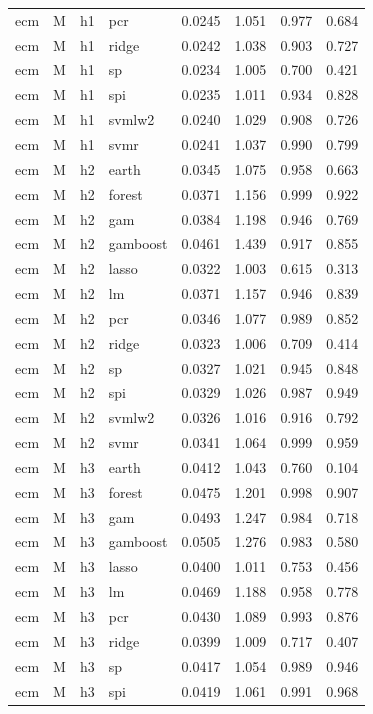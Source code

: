 \begin{ThreePartTable}
\begin{longtable}[t]{llclcccc}
ecm & M & h1 & pcr & 0.0245 & 1.051 & 0.977 & 0.684\\
ecm & M & h1 & ridge & 0.0242 & 1.038 & 0.903 & 0.727\\
ecm & M & h1 & sp & 0.0234 & 1.005 & 0.700 & 0.421\\
ecm & M & h1 & spi & 0.0235 & 1.011 & 0.934 & 0.828\\
ecm & M & h1 & svmlw2 & 0.0240 & 1.029 & 0.908 & 0.726\\
ecm & M & h1 & svmr & 0.0241 & 1.037 & 0.990 & 0.799\\
\addlinespace
ecm & M & h2 & earth & 0.0345 & 1.075 & 0.958 & 0.663\\
ecm & M & h2 & forest & 0.0371 & 1.156 & 0.999 & 0.922\\
ecm & M & h2 & gam & 0.0384 & 1.198 & 0.946 & 0.769\\
ecm & M & h2 & gamboost & 0.0461 & 1.439 & 0.917 & 0.855\\
ecm & M & h2 & lasso & 0.0322 & 1.003 & 0.615 & 0.313\\
ecm & M & h2 & lm & 0.0371 & 1.157 & 0.946 & 0.839\\
ecm & M & h2 & pcr & 0.0346 & 1.077 & 0.989 & 0.852\\
ecm & M & h2 & ridge & 0.0323 & 1.006 & 0.709 & 0.414\\
ecm & M & h2 & sp & 0.0327 & 1.021 & 0.945 & 0.848\\
ecm & M & h2 & spi & 0.0329 & 1.026 & 0.987 & 0.949\\
ecm & M & h2 & svmlw2 & 0.0326 & 1.016 & 0.916 & 0.792\\
ecm & M & h2 & svmr & 0.0341 & 1.064 & 0.999 & 0.959\\
\addlinespace
ecm & M & h3 & earth & 0.0412 & 1.043 & 0.760 & 0.104\\
ecm & M & h3 & forest & 0.0475 & 1.201 & 0.998 & 0.907\\
ecm & M & h3 & gam & 0.0493 & 1.247 & 0.984 & 0.718\\
ecm & M & h3 & gamboost & 0.0505 & 1.276 & 0.983 & 0.580\\
ecm & M & h3 & lasso & 0.0400 & 1.011 & 0.753 & 0.456\\
ecm & M & h3 & lm & 0.0469 & 1.188 & 0.958 & 0.778\\
ecm & M & h3 & pcr & 0.0430 & 1.089 & 0.993 & 0.876\\
ecm & M & h3 & ridge & 0.0399 & 1.009 & 0.717 & 0.407\\
ecm & M & h3 & sp & 0.0417 & 1.054 & 0.989 & 0.946\\
ecm & M & h3 & spi & 0.0419 & 1.061 & 0.991 & 0.968\\

\end{longtable}
\end{ThreePartTable}
